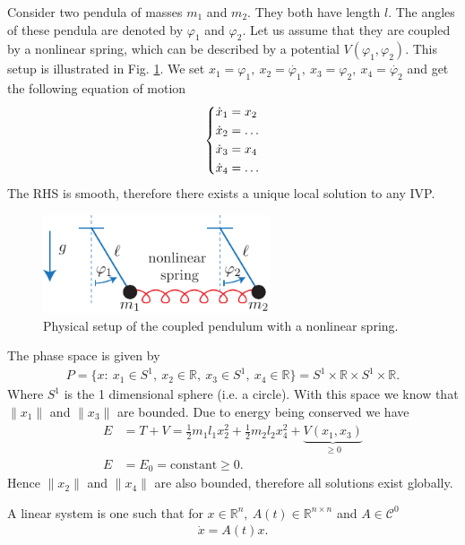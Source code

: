 \begin{ex}
	Consider two pendula of masses $m_1$ and $m_2$. They both have length $l$. The angles of these pendula are denoted by $\varphi_1$ and $\varphi_2$. Let us assume that they are coupled by a nonlinear spring, which can be described by a potential $V(\varphi_1, \varphi_2)$. This setup is illustrated in Fig. \ref{fig:coupled_pendulum}. We set $x_1 = \varphi_1,\ x_2 = \dot{\varphi_1},\ x_3 = \varphi_2,\ x_4=\dot{\varphi_2} $ and get the following equation of motion
\begin{align}
	\begin{dcases}
		\dot{x}_1 = x_2 \\ \dot{x}_2 = \ldots \\ \dot{x}_3 = x_4 \\ \dot{x}_4 = \ldots
	\end{dcases}
\end{align}
The RHS is smooth, therefore there exists a unique local solution to any IVP.
\begin{figure}[h!]
	\centering
	\includegraphics[width=0.6\textwidth]{figures/ch1/6coupled_pendulum.pdf}
	\caption{Physical setup of the coupled pendulum with a nonlinear spring.}
	\label{fig:coupled_pendulum}
\end{figure}
The phase space is given by 
\begin{align}
	P = \{ {x}:\ x_1 \in S^1,\ x_2 \in \mathbb{R},\ x_3 \in S^1,\ x_4 \in \mathbb{R} \} = S^1 \times \mathbb{R}\times S^1 \times \mathbb{R}.
\end{align}
Where $S^1$ is the 1 dimensional sphere (i.e. a circle). With this space we know that $ \|x_1 \|$ and $ \|x_3 \|$ are bounded. Due to energy being conserved we have
\begin{subequations}\begin{align}
	E &= T+V = \frac{1}{2}m_1 l_1 x_2^2 + \frac{1}{2}m_2 l_2 x_4^2 + \underbrace{V(x_1, x_3)}_{\geq 0}\\
	E &= E_0 =  \textrm{constant} \geq 0.
\end{align}\end{subequations}
Hence $ \|x_2 \|$ and $ \|x_4 \|$ are also bounded, therefore all solutions exist globally.
\end{ex}
\begin{definition}
	A linear system is one such that for $ {x}\in \mathbb{R}^{n},\ {A}(t) \in \mathbb{R}^{n\times n}$ and ${A}\in \mathcal{C}^0$ 
	\begin{align}
		\boxed{\dot{ {x}} = {A}(t)  {x}.}
	\end{align}
\end{definition}

